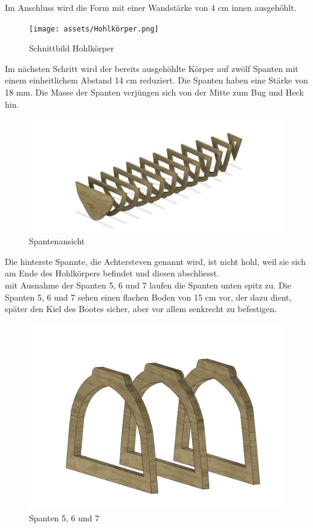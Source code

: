 Im Anschluss wird die Form mit einer Wandstärke von 4 cm innen ausgehöhlt.
\begin{figure}[H]
    \centering
    \texttt{[image: assets/Hohlkörper.png]}
    \caption{Schnittbild Hohlkörper}

\end{figure}
Im nächsten Schritt wird der bereits ausgehöhlte Körper auf zwölf Spanten mit einem einheitlichem Abstand 14 cm reduziert. Die Spanten haben eine Stärke von 18 mm. Die Masse der Spanten verjüngen sich von der Mitte zum Bug und Heck hin.

\begin{figure}[H]
    \centering
    \includegraphics[width=1\linewidth]{assets/rippen_cad.png}
    \caption{Spantenansicht}
    
\end{figure}
Die hinterste Spannte, die Achtersteven genannt wird, ist nicht hohl, weil sie sich am Ende des Hohlkörpers befindet und diesen abschliesst.\\
mit Ausnahme der Spanten 5, 6 und 7 laufen die Spanten unten spitz zu. Die Spanten 5, 6 und 7 sehen einen flachen Boden von 15 cm vor, der dazu dient, später den Kiel des Bootes sicher, aber vor allem senkrecht zu befestigen.

\begin{figure}[H]
    \centering
    \includegraphics[width=0.5\linewidth]{assets/spanent_upside_down.png}
    \caption{Spanten 5, 6 und 7}
    
\end{figure}

